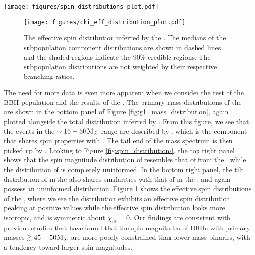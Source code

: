 \begin{figure*}[ht!]
    \begin{centering}
        \texttt{[image: figures/spin\_distributions\_plot.pdf]}
        \caption{The spin magnitude and tilt distributions inferred by the \base{} (top left and bottom left) and the \comp{} (top right and bottom right). In each panel, the medians of the subpopulation component distributions are shown in dashed lines and the shaded regions indicate the $90\%$ credible regions. The dashed gray lines show the $90\%$ credible bounds of the B-Spline models' prior predictive distributions. The subpopulation distributions are not weighted by their respective branching ratios.}
        \label{fig:spin_distributions}
    \end{centering}
\end{figure*}

\begin{figure}[hb]
    \begin{centering}
        \texttt{[image: figures/chi\_eff\_distribution\_plot.pdf]}
        \caption{The effective spin distribution inferred by the \comp{}. The medians of the subpopulation component distributions are shown in dashed lines and the shaded regions indicate the $90\%$ credible regions. The subpopulation distributions are not weighted by their respective branching ratios.}
        \label{fig:chi_eff_distributions}
    \end{centering}
\end{figure}


The need for more data is even more apparent when we consider the rest of the BBH population and the results of the \comp{}. The primary mass distributions of the \comp{} are shown in the bottom panel of Figure \ref{fig:g1_mass_distribution}, again plotted alongside the total distribution inferred by \brucepaper{}. From this figure, we see that the events in the $\sim15-50 {\,\rm M}_\odot$ range are described by \contA{}, which is the component that shares spin properties with \first{}. The tail end of the mass spectrum is then picked up by \contB{}. Looking to Figure \ref{fig:spin_distributions}, the top right panel shows that the spin magnitude distribution of \popA{} resembles that of \popA{} from the \base{}, while the distribution of \popB{} is completely uninformed. In the bottom right panel, the tilt distribution of \popA{} in the \comp{} also shares similarities with that of \popA{} in the \base{}, and again \popB{} possess an uninformed distribution. Figure \ref{fig:chi_eff_distributions} shows the effective spin distributions of the \comp{}, where we see the \popA{} distribution exhibits an effective spin distribution peaking at positive values while the \popB{} effective spin distribution looks more isotropic, and is symmetric about $\chi_\mathrm{eff} = 0$. Our findings are consistent with previous studies \citep{2111.03634,2110.13542} that have found that the spin magnitudes of BBHs with primary masses $\gtrsim 45-50 {\,\rm M}_\odot$ are more poorly constrained than lower mass binaries, with a tendency toward larger spin magnitudes.

